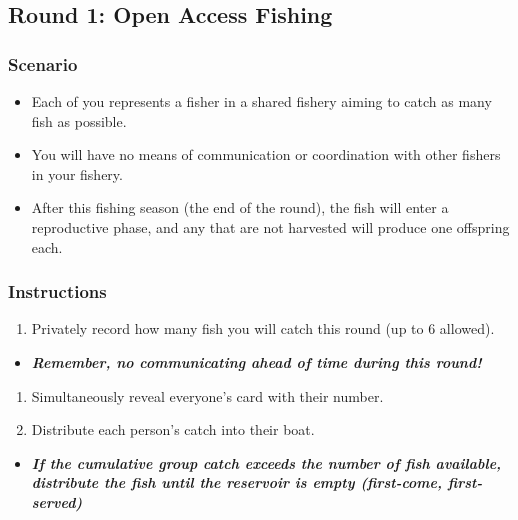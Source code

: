 \documentclass[]{tufte-handout}
\providecommand{\tightlist}{%
  \setlength{\itemsep}{0pt}\setlength{\parskip}{0pt}}
\begin{document}
\subsection{Round 1: Open Access
Fishing}\label{round-1-open-access-fishing}

\subsubsection{Scenario}\label{scenario}

\begin{itemize}
\tightlist
\item
  Each of you represents a fisher in a shared fishery aiming to catch as
  many fish as possible.
\item
  You will have no means of communication or coordination with other
  fishers in your fishery.
\item
  After this fishing season (the end of the round), the fish will enter
  a reproductive phase, and any that are not harvested will produce one
  offspring each.
\end{itemize}

\subsubsection{Instructions}\label{instructions}

\begin{enumerate}
\def\labelenumi{\arabic{enumi}.}
\tightlist
\item
  Privately record how many fish you will catch this round (up to 6
  allowed).
\end{enumerate}

\begin{itemize}
\tightlist
\item
  \textbf{\emph{Remember, no communicating ahead of time during this
  round!}}
\end{itemize}

\begin{enumerate}
\def\labelenumi{\arabic{enumi}.}
\setcounter{enumi}{1}
\tightlist
\item
  Simultaneously reveal everyone's card with their number.
\item
  Distribute each person's catch into their boat.
\end{enumerate}

\begin{itemize}
\tightlist
\item
  \textbf{\emph{If the cumulative group catch exceeds the number of fish
  available, distribute the fish until the reservoir is empty
  (first-come, first-served)}}
\end{itemize}
\end{document}
